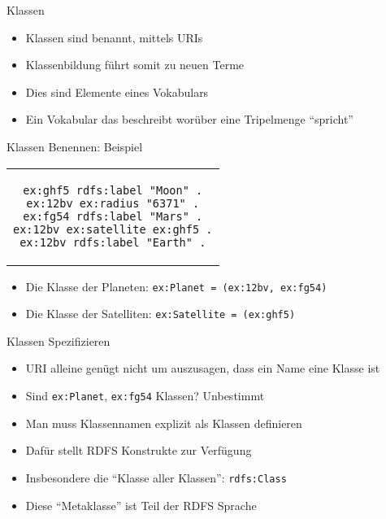 \documentclass{beamer}
\begin{document}
\begin{frame}{Klassen}
	
	\begin{itemize}
		\item Klassen sind benannt, mittels URIs
		\item Klassenbildung führt somit zu neuen Terme
		\item Dies sind Elemente eines Vokabulars
		\item Ein Vokabular das beschreibt worüber eine Tripelmenge ``spricht''
	\end{itemize}
	
\end{frame}

\begin{frame}[fragile]{Klassen Benennen: Beispiel}
	
    \begin{center}
    	\begin{tabular}{c}
			\begin{lstlisting}
ex:ghf5 rdfs:label "Moon" .
ex:12bv ex:radius "6371" .
ex:fg54 rdfs:label "Mars" .
ex:12bv ex:satellite ex:ghf5 .
ex:12bv rdfs:label "Earth" .
			\end{lstlisting}
		\end{tabular}
	\end{center}
	
	\begin{itemize}
		\item Die Klasse der Planeten: \texttt{ex:Planet = (ex:12bv, ex:fg54)} 
		\item Die Klasse der Satelliten: \texttt{ex:Satellite = (ex:ghf5)}
	\end{itemize}
	
\end{frame}

\begin{frame}{Klassen Spezifizieren}
	
	\begin{itemize}
		\item URI alleine genügt nicht um auszusagen, dass ein Name eine Klasse ist
		\item Sind \texttt{ex:Planet}, \texttt{ex:fg54} Klassen? Unbestimmt
		\item Man muss Klassennamen explizit als Klassen definieren
		\item Dafür stellt RDFS Konstrukte zur Verfügung
		\item Insbesondere die ``Klasse aller Klassen'': \texttt{rdfs:Class}
		\item Diese ``Metaklasse'' ist Teil der RDFS Sprache
	\end{itemize}
	
\end{frame}
\end{document}
